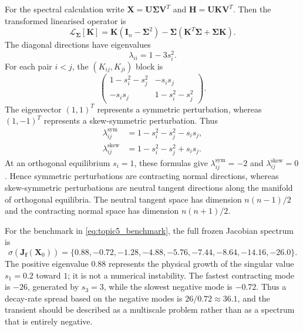 \documentclass[11pt,a4paper]{article}
\theoremstyle{definition}
\theoremstyle{remark}
\begin{document}
For the spectral calculation write $\mathbf{X}=\mathbf{U}\boldsymbol{\Sigma}\mathbf{V}^T$ and $\mathbf{H}=\mathbf{U}\mathbf{K}\mathbf{V}^T$. Then the transformed linearised operator is
\begin{equation}
\label{eq:svd_linearised_operator}
\mathcal{L}_{\boldsymbol{\Sigma}}[\mathbf{K}]
=\mathbf{K}(\mathbf{I}_n-\boldsymbol{\Sigma}^2)
-\boldsymbol{\Sigma}(\mathbf{K}^T\boldsymbol{\Sigma}+\boldsymbol{\Sigma}\mathbf{K}).
\end{equation}
The diagonal directions have eigenvalues
\begin{equation}
\label{eq:diagonal_jacobian_eigenvalues}
\lambda_{ii}=1-3s_i^2.
\end{equation}
For each pair $i<j$, the $(K_{ij},K_{ji})$ block is
\begin{equation}
\label{eq:offdiagonal_jacobian_eigenvalues}
\begin{pmatrix}
1-s_i^2-s_j^2 & -s_i s_j \\
-s_i s_j & 1-s_i^2-s_j^2
\end{pmatrix}.
\end{equation}
The eigenvector $(1,1)^T$ represents a symmetric perturbation,
whereas $(1,-1)^T$ represents a skew-symmetric perturbation. Thus
\begin{align}
\lambda_{ij}^{\mathrm{sym}}
&=1-s_i^2-s_j^2-s_i s_j, \\
\lambda_{ij}^{\mathrm{skew}}
&=1-s_i^2-s_j^2+s_i s_j.
\end{align}
At an orthogonal equilibrium $s_i=1$, these formulas give
$\lambda_{ij}^{\mathrm{sym}}=-2$ and
$\lambda_{ij}^{\mathrm{skew}}=0$. Hence symmetric perturbations are
contracting normal directions, whereas skew-symmetric perturbations are
neutral tangent directions along the manifold of orthogonal equilibria.
The neutral tangent space has dimension $n(n-1)/2$ and the contracting
normal space has dimension $n(n+1)/2$.

For the benchmark in \eqref{eq:topic5_benchmark}, the full frozen Jacobian spectrum is
\begin{equation}
\label{eq:topic5_initial_spectrum}
\sigma\left(\mathbf{J}_{\mathbf{f}}(\mathbf{X}_0)\right)
=\{0.88,-0.72,-1.28,-4.88,-5.76,-7.44,-8.64,-14.16,-26.0\}.
\end{equation}
The positive eigenvalue $0.88$ represents the physical growth of the singular value $s_1=0.2$ toward $1$; it is not a numerical instability. The fastest contracting mode is $-26$, generated by $s_3=3$, while the slowest negative mode is $-0.72$. Thus a decay-rate spread based on the negative modes is $26/0.72\approx36.1$, and the transient should be described as a multiscale problem rather than as a spectrum that is entirely negative.
\end{document}
